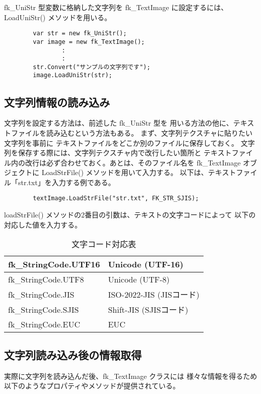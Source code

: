 fk\_UniStr 型変数に格納した文字列を
fk\_TextImage に設定するには、LoadUniStr() メソッドを用いる。
\\
\begin{screen}
\begin{verbatim}
        var str = new fk_UniStr();
        var image = new fk_TextImage();
                :
                :
        str.Convert("サンプルの文字列です");
        image.LoadUniStr(str);
\end{verbatim}
\end{screen}

\subsection{文字列情報の読み込み}
文字列を設定する方法は、前述した fk\_UniStr 型を
用いる方法の他に、テキストファイルを読み込むという方法もある。
まず、文字列テクスチャに貼りたい文字列を事前に
テキストファイルをどこか別のファイルに保存しておく。
文字列を保存する際には、文字列テクスチャ内で改行したい箇所と
テキストファイル内の改行は必ず合わせておく。あとは、そのファイル名を
fk\_TextImage オブジェクトに LoadStrFile() メソッドを用いて入力する。
以下は、テキストファイル「str.txt」を入力する例である。
\\
\begin{screen}
\begin{verbatim}
        textImage.LoadStrFile("str.txt", FK_STR_SJIS);
\end{verbatim}
\end{screen}
loadStrFile() メソッドの2番目の引数は、テキストの文字コードによって
以下の対応した値を入力する。

\begin{table}[H]
\caption{文字コード対応表}
\label{tbl:stringCode}
\begin{center}
\begin{tabular}{|l|l|}
\hline
fk\_StringCode.UTF16 & Unicode (UTF-16) \\ \hline
fk\_StringCode.UTF8 & Unicode (UTF-8) \\ \hline
fk\_StringCode.JIS & ISO-2022-JIS (JISコード) \\ \hline
fk\_StringCode.SJIS & Shift-JIS (SJISコード) \\ \hline
fk\_StringCode.EUC & EUC \\ \hline
\end{tabular}
\end{center}
\end{table}

\subsection{文字列読み込み後の情報取得}
実際に文字列を読み込んだ後、fk\_TextImage クラスには
様々な情報を得るため以下のようなプロパティやメソッドが提供されている。

